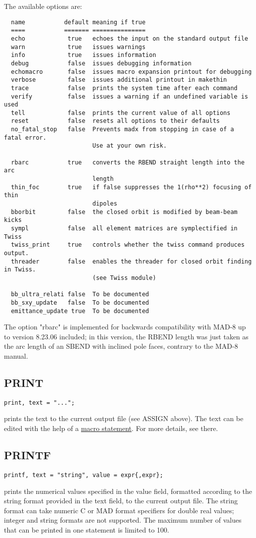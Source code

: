 The available options are: 
\begin{verbatim}
  name           default meaning if true
  ====           ======= ===============
  echo            true   echoes the input on the standard output file
  warn            true   issues warnings
  info            true   issues information
  debug           false  issues debugging information
  echomacro       false  issues macro expansion printout for debugging
  verbose         false  issues additional printout in makethin
  trace           false  prints the system time after each command
  verify          false  issues a warning if an undefined variable is used
  tell            false  prints the current value of all options
  reset           false  resets all options to their defaults
  no_fatal_stop   false  Prevents madx from stopping in case of a fatal error. 
                         Use at your own risk.

  rbarc           true   converts the RBEND straight length into the arc 
                         length
  thin_foc        true   if false suppresses the 1(rho**2) focusing of thin 
                         dipoles
  bborbit         false  the closed orbit is modified by beam-beam kicks
  sympl           false  all element matrices are symplectified in Twiss
  twiss_print     true   controls whether the twiss command produces output.
  threader        false  enables the threader for closed orbit finding in Twiss.
                         (see Twiss module)

  bb_ultra_relati false  To be documented
  bb_sxy_update   false  To be documented 
  emittance_update true  To be documented
\end{verbatim} 

The option "rbarc" is implemented for backwards compatibility with MAD-8
up to version 8.23.06 included; in this version, the RBEND length was
just taken as the arc length of an SBEND with inclined pole faces,
contrary to the MAD-8 manual.  


\subsection{PRINT}
\begin{verbatim}
print, text = "...";
\end{verbatim} 
prints the text to the current output file (see ASSIGN above). The text
can be edited with the help of a  \href{special.html#macro}{macro
  statement}. For more details, see there.  


\subsection{PRINTF}
\begin{verbatim}
printf, text = "string", value = expr{,expr};
\end{verbatim}
prints the numerical values specified in the value field, formatted
according to the string format provided in the text field, to the
current output file.  
The string format can take numeric C or MAD format specifiers for double
real values; integer and string formats are not supported. 
The maximum number of values that can be printed in one
statement is limited to 100. 

